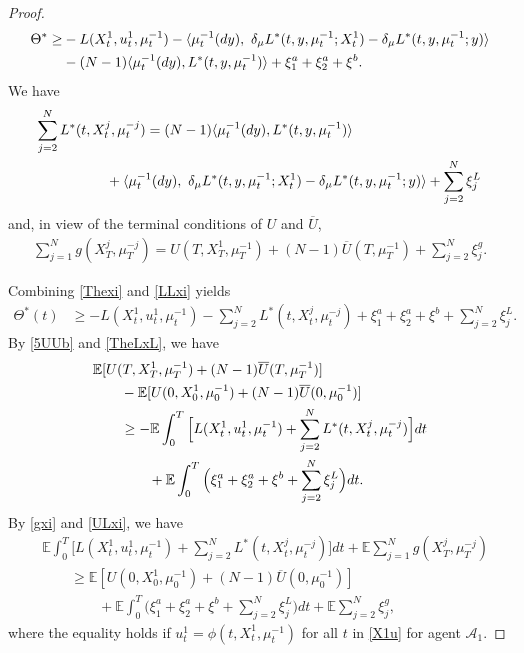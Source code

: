 \documentclass{amsart}
\theoremstyle{definition}
\theoremstyle{remark}
\def\EE{{\mathbb E}}
\numberwithin{equation}{section}
\begin{document}
\begin{proof}
\begin{align}
 \Theta^*
\ge &- L(X_t^1, u_t^1, \mu_t^{-1})-  \langle \mu_t^{-1}(dy) , \   \delta_\mu L^* (t,y,\mu_t^{-1}; X_t^1) - \delta_\mu L^*(t,y,\mu_t^{-1}; y) \rangle \notag \\
& -(N-1)\langle \mu_t^{-1}(dy), L^*(t, y, \mu_t^{-1}) \rangle
  + \xi_1^a +\xi_2^a+ \xi^b. \label{Thexi}
\end{align}
We have
\begin{align}
\sum_{j=2}^N L^*(t, X_t^j, \mu_t^{-j})&=
 (N-1)\langle \mu_t^{-1}(dy), L^*(t, y, \mu_t^{-1}) \rangle\label{LLxi}  \\
&\hskip -1cm  +\langle \mu_t^{-1}(dy) , \   \delta_\mu L^* (t,y,\mu_t^{-1}; X_t^1) - \delta_\mu L^*(t,y,\mu_t^{-1}; y) \rangle + \sum_{j=2}^N \xi^L_j \notag
\end{align}
and, in view of the terminal conditions of $U$ and $\overline U$,
\begin{align}
\sum_{j=1}^N g(X_T^j, \mu_T^{-j})=   U(T, X_T^1, \mu_T^{-1})+(N-1) \overline U(T,  \mu_T^{-1}) +\sum_{j=2}^N \xi^g_j.\label{gxi}
\end{align}

Combining \eqref{Thexi} and \eqref{LLxi} yields
\begin{align}
\Theta^*(t) &\ge - L(X_t^1, u_t^1, \mu_t^{-1})-\sum_{j=2}^NL^*(t, X_t^j, \mu_t^{-j}) +\xi_1^a+ \xi_2^a + \xi^b + \sum_{j=2}^N \xi^L_j.\label{TheLxL}
\end{align}
By \eqref{5UUb} and \eqref{TheLxL}, we have
\begin{align}
&\EE [U(T, X_T^1, \mu_T^{-1})+(N-1) \overline U(T,  \mu_T^{-1})]\label{ULxi} \\
& \qquad -\EE [U(0, X_0^1, \mu_0^{-1}) +(N-1) \overline U(0, \mu_0^{-1} ) ]\notag\\
&\qquad \ge -\EE \int_0^T\Big[ L(X_t^1, u_t^1, \mu_t^{-1})+\sum_{j=2}^NL^*(t, X_t^j, \mu_t^{-j})\Big]dt\notag \\
&\qquad\qquad+\EE \int_0^T\Big
(\xi_1^a +\xi_2^a+ \xi^b+ \sum_{j=2}^N \xi^L_j\Big) dt
.\notag
\end{align}
By \eqref{gxi} and \eqref{ULxi},
 we have
\begin{align*}
&\EE \int_0^T \Big[ L(X_t^1, u_t^1, \mu_t^{-1})+\sum_{j=2}^NL^*(t, X_t^j, \mu_t^{-j})\Big] dt +\EE \sum_{j=1}^N g(X_T^j, \mu_{T}^{-j})\\
& \qquad \ge\EE [U(0, X_0^1, \mu_0^{-1}) +(N-1) \overline U(0, \mu_0^{-1} ) ]\\
&\qquad\qquad+\EE \int_0^T \Big( \xi_1^a +\xi_2^a + \xi^b+ \sum_{j=2}^N \xi^L_j
 \Big) dt +\EE   \sum_{j=2}^N \xi^g_j,
\end{align*}
where the equality holds if $u_t^1=\phi(t, X_t^1, \mu_t^{-1})$ for all $t$ in \eqref{X1u} for agent ${\mathcal A}_1$.
\end{proof}
\end{document}
